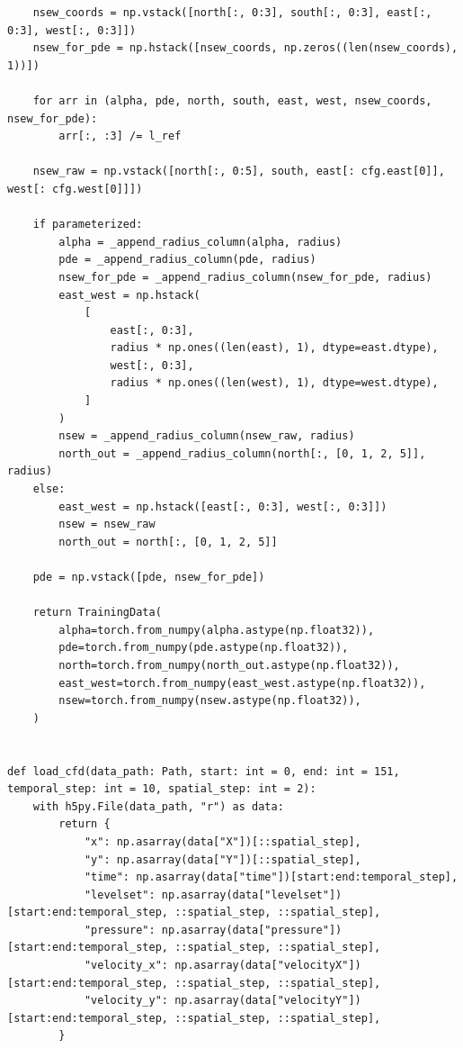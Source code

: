 \begin{lstlisting}
    nsew_coords = np.vstack([north[:, 0:3], south[:, 0:3], east[:, 0:3], west[:, 0:3]])
    nsew_for_pde = np.hstack([nsew_coords, np.zeros((len(nsew_coords), 1))])

    for arr in (alpha, pde, north, south, east, west, nsew_coords, nsew_for_pde):
        arr[:, :3] /= l_ref

    nsew_raw = np.vstack([north[:, 0:5], south, east[: cfg.east[0]], west[: cfg.west[0]]])

    if parameterized:
        alpha = _append_radius_column(alpha, radius)
        pde = _append_radius_column(pde, radius)
        nsew_for_pde = _append_radius_column(nsew_for_pde, radius)
        east_west = np.hstack(
            [
                east[:, 0:3],
                radius * np.ones((len(east), 1), dtype=east.dtype),
                west[:, 0:3],
                radius * np.ones((len(west), 1), dtype=west.dtype),
            ]
        )
        nsew = _append_radius_column(nsew_raw, radius)
        north_out = _append_radius_column(north[:, [0, 1, 2, 5]], radius)
    else:
        east_west = np.hstack([east[:, 0:3], west[:, 0:3]])
        nsew = nsew_raw
        north_out = north[:, [0, 1, 2, 5]]

    pde = np.vstack([pde, nsew_for_pde])

    return TrainingData(
        alpha=torch.from_numpy(alpha.astype(np.float32)),
        pde=torch.from_numpy(pde.astype(np.float32)),
        north=torch.from_numpy(north_out.astype(np.float32)),
        east_west=torch.from_numpy(east_west.astype(np.float32)),
        nsew=torch.from_numpy(nsew.astype(np.float32)),
    )


def load_cfd(data_path: Path, start: int = 0, end: int = 151, temporal_step: int = 10, spatial_step: int = 2):
    with h5py.File(data_path, "r") as data:
        return {
            "x": np.asarray(data["X"])[::spatial_step],
            "y": np.asarray(data["Y"])[::spatial_step],
            "time": np.asarray(data["time"])[start:end:temporal_step],
            "levelset": np.asarray(data["levelset"])[start:end:temporal_step, ::spatial_step, ::spatial_step],
            "pressure": np.asarray(data["pressure"])[start:end:temporal_step, ::spatial_step, ::spatial_step],
            "velocity_x": np.asarray(data["velocityX"])[start:end:temporal_step, ::spatial_step, ::spatial_step],
            "velocity_y": np.asarray(data["velocityY"])[start:end:temporal_step, ::spatial_step, ::spatial_step],
        }
\end{lstlisting}

